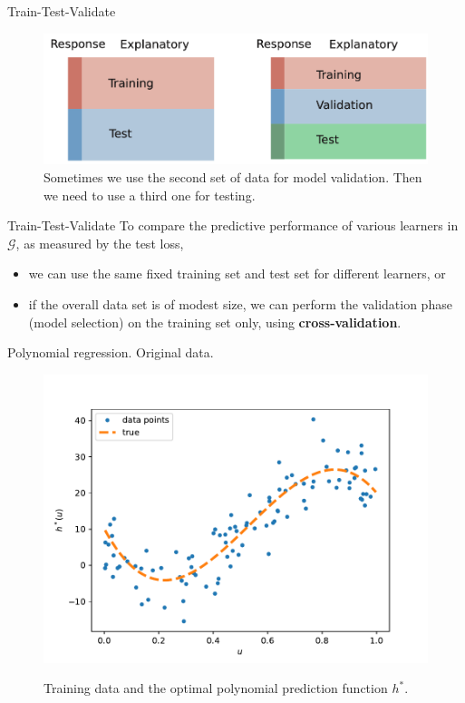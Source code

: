 \documentclass{beamer}
\begin{document}
\begin{frame}{Train-Test-Validate}
  \begin{figure}
    \includegraphics[width=0.7\linewidth]{traintestvalidate}
    \caption{Sometimes we use the second set of data for model validation. Then we need to use a third one for testing.}
    \label{fig:ttv}
  \end{figure}
\end{frame}

\begin{frame}{Train-Test-Validate}
  To compare the predictive performance of various learners in $\mathcal{G}$, as measured by the test loss,
  \begin{itemize}
    \item  we can use the same fixed training set  and test set for different learners, or
    \item if the overall data set is of modest size, we can perform the validation phase (model selection) on the training set only, using {\bf cross-validation}. 
  \end{itemize}

\end{frame}

\begin{frame}{Polynomial regression. Original data.}
  \begin{figure}
    \includegraphics[width=0.7\linewidth]{polydatpy}
    \label{fig:polydatpy}
    \caption{Training data and the optimal polynomial prediction function $h^*$.}
  \end{figure}
\end{frame}
\end{document}

